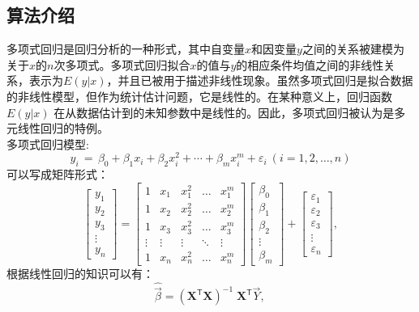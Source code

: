 \documentclass{ctexart}
\begin{document}
\subsection{算法介绍}
多项式回归是回归分析的一种形式，其中自变量$ x $和因变量$ y $之间的关系被建模为关于$ x $的$ n $次多项式。多项式回归拟合$x$的值与$ y $的相应条件均值之间的非线性关系，表示为$ E(y|x)$，并且已被用于描述非线性现象。虽然多项式回归是拟合数据的非线性模型，但作为统计估计问题，它是线性的。在某种意义上，回归函数$ E(y|x)$ 在从数据估计到的未知参数中是线性的。因此，多项式回归被认为是多元线性回归的特例。\\
多项式回归模型:
\begin{equation}
{\displaystyle y_{i}\,=\,\beta _{0}+\beta _{1}x_{i}+\beta _{2}x_{i}^{2}+\cdots +\beta _{m}x_{i}^{m}+\varepsilon _{i}\ (i=1,2,\dots ,n)}
\end{equation}
可以写成矩阵形式：
\begin{equation}
{\displaystyle {\begin{bmatrix}y_{1}\\y_{2}\\y_{3}\\\vdots \\y_{n}\end{bmatrix}}={\begin{bmatrix}1&x_{1}&x_{1}^{2}&\dots &x_{1}^{m}\\1&x_{2}&x_{2}^{2}&\dots &x_{2}^{m}\\1&x_{3}&x_{3}^{2}&\dots &x_{3}^{m}\\\vdots &\vdots &\vdots &\ddots &\vdots \\1&x_{n}&x_{n}^{2}&\dots &x_{n}^{m}\end{bmatrix}}{\begin{bmatrix}\beta _{0}\\\beta _{1}\\\beta _{2}\\\vdots \\\beta _{m}\end{bmatrix}}+{\begin{bmatrix}\varepsilon _{1}\\\varepsilon _{2}\\\varepsilon _{3}\\\vdots \\\varepsilon _{n}\end{bmatrix}},}
\end{equation}
根据线性回归的知识可以有：
\begin{equation}
{\displaystyle {\widehat {\vec {\beta }}}=(\mathbf {X} ^{\mathsf {T}}\mathbf {X} )^{-1}\;\mathbf {X} ^{\mathsf {T}}{\vec {Y}},\,}
\end{equation}
\end{document}
